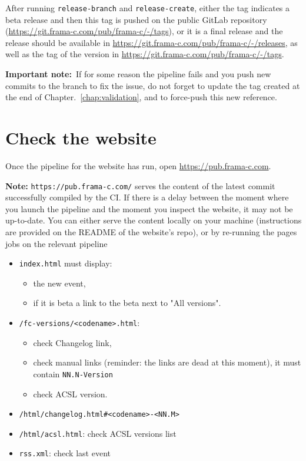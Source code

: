After running \texttt{release-branch} and \texttt{release-create}, either the
tag indicates a beta release and then this tag is pushed on the public GitLab
repository (\url{https://git.frama-c.com/pub/frama-c/-/tags}), or it is a final
release and the release should be available in
\url{https://git.frama-c.com/pub/frama-c/-/releases}, as well as the tag of the
version in \url{https://git.frama-c.com/pub/frama-c/-/tags}.

\textbf{Important note:}~If for some reason the pipeline fails and you push new
commits to the branch to fix the issue, do not forget to update the tag created
at the end of Chapter.~\ref{chap:validation}, and to force-push this new reference.

\section{Check the website}
\label{sec:check-website}

Once the pipeline for the website has run, open \url{https://pub.frama-c.com}.

\textbf{Note:} \texttt{https://pub.frama-c.com/} serves the content of the latest
commit successfully compiled by the CI. If there is a delay between the moment where
you launch the pipeline and the moment you inspect the website, it may not be up-to-date.
You can either serve the content locally on your machine (instructions are provided
on the README of the website's repo), or by re-running the pages jobs on the relevant pipeline

\begin{itemize}
  \item \texttt{index.html} must display:
  \begin{itemize}
    \item the new event,
    \item if it is beta a link to the beta next to "All versions".
  \end{itemize}
  \item \texttt{/fc-versions/<codename>.html}:
  \begin{itemize}
    \item check Changelog link,
    \item check manual links (reminder: the links are dead at this moment), it must contain \texttt{NN.N-Version}
    \item check ACSL version.
  \end{itemize}
  \item \texttt{/html/changelog.html\#<codename>-<NN.M>}
  \item \texttt{/html/acsl.html}: check ACSL versions list
  \item \texttt{rss.xml}: check last event
\end{itemize}


